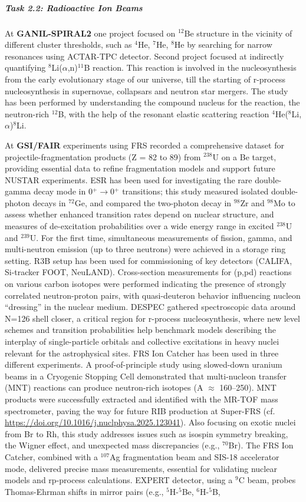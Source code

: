 \subparagraph{Task 2.2: Radioactive Ion Beams} \mbox{}

At \textbf{GANIL-SPIRAL2} one project focused on $^{12}$Be structure in the vicinity of different cluster thresholds, such as $^4$He, $^7$He, $^8$He by searching for narrow resonances using ACTAR-TPC detector. Second project focused at indirectly quantifying $^8$Li($\alpha$,n)$^{11}$B reaction. This reaction is involved in the nucleosynthesis from the early evolutionary stage of our universe, till the starting of r-process nucleosynthesis in supernovae, collapsars and neutron star mergers. The study has been performed by understanding the compound nucleus for the reaction, the neutron-rich $^{12}$B, with the help of the resonant elastic scattering reaction $^4$He($^8$Li,$\alpha$)$^8$Li.

At \textbf{GSI/FAIR} experiments using FRS recorded a comprehensive dataset for projectile-fragmentation products (Z = 82 to 89) from $^{238}$U on a Be target, providing essential data to refine fragmentation models and support future NUSTAR experiments. ESR has been used for investigating the rare double-gamma decay mode in 0$^+$$\rightarrow$0$^+$ transitions; this study measured isolated double-photon decays in $^{72}$Ge, and compared the two-photon decay in $^{98}$Zr and $^{98}$Mo to assess whether enhanced transition rates depend on nuclear structure, and measures of de-excitation probabilities over a wide energy range in excited $^{238}$U and $^{239}$U. For the first time, simultaneous measurements of fission, gamma, and multi-neutron emission (up to three neutrons) were achieved in a storage ring setting. R3B setup has been used for commissioning of key detectors (CALIFA, Si-tracker FOOT, NeuLAND). Cross-section measurements for (p,pd) reactions on various carbon isotopes were performed indicating the presence of strongly correlated neutron-proton pairs, with quasi-deuteron behavior influencing nucleon “dressing” in the nuclear medium. DESPEC gathered spectroscopic data around N=126 shell closer, a critical region for r-process nucleosynthesis, where new level schemes and transition probabilities help benchmark models describing the interplay of single-particle orbitals and collective excitations in heavy nuclei relevant for the astrophysical sites. FRS Ion Catcher has been used in three different experiments. A proof-of-principle study using slowed-down uranium beams in a Cryogenic Stopping Cell demonstrated that multi-nucleon transfer (MNT) reactions can produce neutron-rich isotopes (A $\approx$ 160–250). MNT products were successfully extracted and identified with the MR-TOF mass spectrometer, paving the way for future RIB production at Super-FRS (cf. \url{https://doi.org/10.1016/j.nuclphysa.2025.123041}). Also focusing on exotic nuclei from Br to Rh, this study addresses issues such as isospin symmetry breaking, the Wigner effect, and unexpected mass discrepancies (e.g., $^{70}$Br). The FRS Ion Catcher, combined with a $^{107}$Ag fragmentation beam and SIS-18 accelerator mode, delivered precise mass measurements, essential for validating nuclear models and rp-process calculations. EXPERT detector, using a $^9$C beam, probes Thomas-Ehrman shifts in mirror pairs (e.g., $^5$H-$^5$Be, $^6$H-$^5$B, 